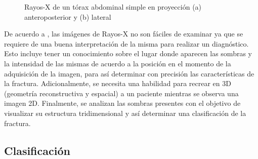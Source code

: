 \begin{figure}[htb]
  \begin{center}
     \hspace{1cm}
  \end{center}
  \caption{Rayos-X de un t\'orax abdominal simple en proyecci\'on (a) anteroposterior y (b) lateral}
  \label{fig:proyeccion}
\end{figure}

De acuerdo a \cite{SQUIRE69}, las im\'agenes de Rayos-X no son f\'aciles de examinar ya que se requiere de una buena interpretaci\'on de la misma para realizar un diagn\'ostico. Esto incluye tener un conocimiento sobre el lugar donde aparecen las sombras y la intensidad de las mismas de acuerdo a la posici\'on en el momento de la adquisici\'on de la imagen, para as\'i determinar con precisi\'on las caracter\'isticas de la fractura. Adicionalmente, se necesita una habilidad para recrear en 3D (geometr\'ia reconstructiva y espacial) a un paciente mientras se observa una imagen 2D. Finalmente, se analizan las sombras presentes con el objetivo de visualizar su estructura tridimensional y as\'i determinar una clasificaci\'on de la fractura.

\subsection{Clasificaci\'on}

